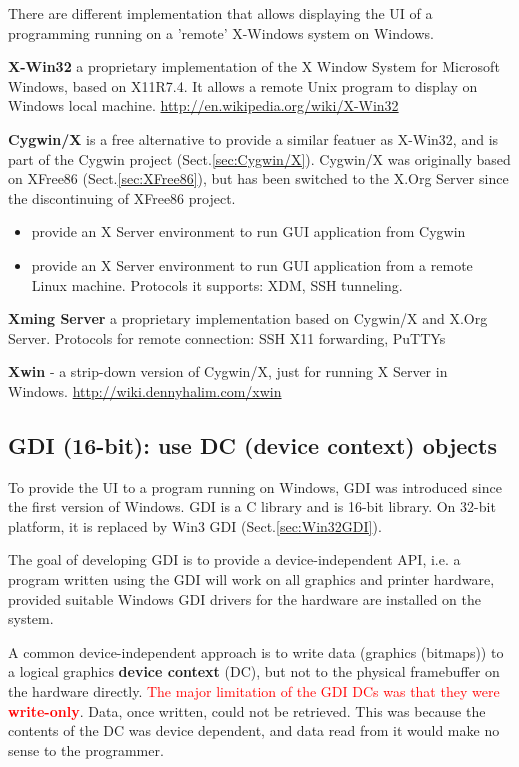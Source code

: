 There are different implementation that allows displaying the UI of a
programming running on a 'remote' X-Windows system on Windows.

{\bf X-Win32} a proprietary implementation of the X Window System for Microsoft
Windows, based on X11R7.4. It allows a remote Unix program to display on Windows
local machine. \url{http://en.wikipedia.org/wiki/X-Win32}

{\bf Cygwin/X} is a free alternative to provide a similar featuer as X-Win32,
and is part of the Cygwin project (Sect.\ref{sec:Cygwin/X}).
Cygwin/X was originally based on XFree86 (Sect.\ref{sec:XFree86}), but
has been switched to the X.Org Server since the discontinuing of XFree86
project.
\begin{itemize}
  \item provide an X Server environment to run GUI application from Cygwin
  \item provide an X Server environment to run GUI application from a remote
  Linux machine. Protocols it supports: XDM, SSH tunneling.
\end{itemize}

{\bf Xming Server} a proprietary implementation based on Cygwin/X and X.Org
Server. Protocols for remote connection: SSH X11 forwarding, PuTTYs

{\bf Xwin} - a strip-down version of Cygwin/X, just for running X Server in
Windows. \url{http://wiki.dennyhalim.com/xwin}

\subsection{GDI (16-bit): use DC (device context) objects}
\label{sec:GDI}
\label{sec:DC-device-context}

To provide the UI to a program running on Windows, GDI was introduced since the
first version of Windows. GDI is a C library and is 16-bit library. On 32-bit
platform, it is replaced by Win3 GDI (Sect.\ref{sec:Win32GDI}).

The goal of developing GDI is to provide a device-independent API, i.e.
a program written using the GDI will work on all graphics and printer hardware,
provided suitable Windows GDI drivers for the hardware are installed on the
system. 

A common device-independent approach is to write data (graphics (bitmaps)) to a
logical graphics {\bf device context} (DC), but not to the physical framebuffer
on the hardware directly.
\textcolor{red}{The major limitation of the GDI DCs was that they were {\bf
write-only}}. Data, once written, could not be retrieved.
This was because the contents of the DC was device dependent, and data read from
it would make no sense to the programmer.

